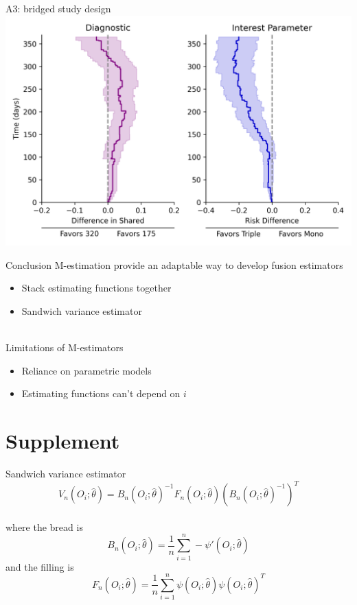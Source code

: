 \documentclass{beamer}
\begin{document}
\begin{frame}{A3: bridged study design}
	\centering 
	\includegraphics[scale=0.6]{images/ex_a3_results.png}
\end{frame}

\begin{frame}{Conclusion}
	M-estimation provide an adaptable way to develop fusion estimators
	\begin{itemize}
		\item Stack estimating functions together
		\item Sandwich variance estimator
	\end{itemize}~\\
	Limitations of M-estimators
	\begin{itemize}
		\item Reliance on parametric models
		\item Estimating functions can't depend on $i$
	\end{itemize}
\end{frame}

\section{Supplement}

\begin{frame}{Sandwich variance estimator}
	\[V_n(O_i; \hat{\theta}) = B_n(O_i; \hat{\theta})^{-1} F_n(O_i; \hat{\theta}) \left(B_n(O_i; \hat{\theta})^{-1}\right)^T\]~\\
	where the bread is
	\[B_n(O_i; \hat{\theta}) = \frac{1}{n} \sum_{i=1}^{n} - \psi'(O_i; \hat{\theta})\]
	and the filling is
	\[F_n(O_i; \hat{\theta}) = \frac{1}{n} \sum_{i=1}^{n} \psi(O_i; \hat{\theta}) \psi(O_i; \hat{\theta})^T\]
\end{frame}
\end{document}
